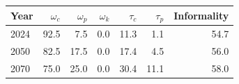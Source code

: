 \begin{tabular}{lrrrrrr}
\toprule
Year & $\omega_c$ & $\omega_p$ & $\omega_k$ & $\tau_c$ & $\tau_p$ & Informality \\
\midrule
2024 & 92.5 & 7.5 & 0.0 & 11.3 & 1.1 & 54.7 \\
2050 & 82.5 & 17.5 & 0.0 & 17.4 & 4.5 & 56.0 \\
2070 & 75.0 & 25.0 & 0.0 & 30.4 & 11.1 & 58.0 \\
\bottomrule
\end{tabular}
